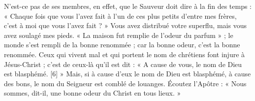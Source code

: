  N’est-ce pas de ses membres, en effet, que le Sauveur doit dire à la fin des temps : « Chaque fois que vous l’avez fait à l’un de ces plus petits d’entre mes frères, c’est à moi que vous l’avez fait ? » Vous avez distribué votre superflu, mais vous avez soulagé mes pieds. « La maison fut remplie de l’odeur du parfum » ; le monde s’est rempli de la bonne renommée ; car la bonne odeur, c’est la bonne renommée. Ceux qui vivent mal et qui portent le nom de chrétiens font injure à Jésus-Christ ; c’est de ceux-là qu’il est dit : « A cause de vous, le nom de Dieu est blasphémé. [6] » Mais, si à cause d’eux le nom de Dieu est blasphémé, à cause des bons, le nom du Seigneur est comblé de louanges. Écoutez l’Apôtre : « Nous sommes, dit-il, une bonne odeur du Christ en tous lieux. »